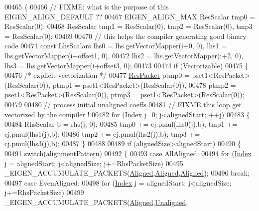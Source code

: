 \begin{DoxyCode}
{{00465   \{
00466     \textcolor{comment}{// FIXME: what is the purpose of this EIGEN\_ALIGN\_DEFAULT ??}
00467     EIGEN\_ALIGN\_MAX ResScalar tmp0 = ResScalar(0);
00468     ResScalar tmp1 = ResScalar(0), tmp2 = ResScalar(0), tmp3 = ResScalar(0);
00469 
00470     \textcolor{comment}{// this helps the compiler generating good binary code}
00471     \textcolor{keyword}{const} LhsScalars lhs0 = lhs.getVectorMapper(i+0, 0),    lhs1 = lhs.getVectorMapper(i+offset1, 0),
00472                      lhs2 = lhs.getVectorMapper(i+2, 0),    lhs3 = lhs.getVectorMapper(i+offset3, 0);
00473 
00474     \textcolor{keywordflow}{if} (Vectorizable)
00475     \{
00476       \textcolor{comment}{/* explicit vectorization */}
00477       \hyperlink{class_eigen_1_1internal_1_1_tensor_lazy_evaluator_writable}{ResPacket} ptmp0 = pset1<ResPacket>(ResScalar(0)), ptmp1 = pset1<ResPacket>(ResScalar(0)),
00478                 ptmp2 = pset1<ResPacket>(ResScalar(0)), ptmp3 = pset1<ResPacket>(ResScalar(0));
00479 
00480       \textcolor{comment}{// process initial unaligned coeffs}
00481       \textcolor{comment}{// FIXME this loop get vectorized by the compiler !}
00482       \textcolor{keywordflow}{for} (\hyperlink{namespace_eigen_a62e77e0933482dafde8fe197d9a2cfde}{Index} j=0; j<alignedStart; ++j)
00483       \{
00484         RhsScalar b = rhs(j, 0);
00485         tmp0 += cj.pmul(lhs0(j),b); tmp1 += cj.pmul(lhs1(j),b);
00486         tmp2 += cj.pmul(lhs2(j),b); tmp3 += cj.pmul(lhs3(j),b);
00487       \}
00488 
00489       \textcolor{keywordflow}{if} (alignedSize>alignedStart)
00490       \{
00491         \textcolor{keywordflow}{switch}(alignmentPattern)
00492         \{
00493           \textcolor{keywordflow}{case} AllAligned:
00494             \textcolor{keywordflow}{for} (\hyperlink{namespace_eigen_a62e77e0933482dafde8fe197d9a2cfde}{Index} j = alignedStart; j<alignedSize; j+=RhsPacketSize)
00495               \_EIGEN\_ACCUMULATE\_PACKETS(\hyperlink{group__enums_gga45fe06e29902b7a2773de05ba27b47a1ad37d4c71425bb286e9b4103830538fbf}{Aligned},\hyperlink{group__enums_gga45fe06e29902b7a2773de05ba27b47a1ad37d4c71425bb286e9b4103830538fbf}{Aligned},\hyperlink{group__enums_gga45fe06e29902b7a2773de05ba27b47a1ad37d4c71425bb286e9b4103830538fbf}{Aligned});
00496             \textcolor{keywordflow}{break};
00497           \textcolor{keywordflow}{case} EvenAligned:
00498             \textcolor{keywordflow}{for} (\hyperlink{namespace_eigen_a62e77e0933482dafde8fe197d9a2cfde}{Index} j = alignedStart; j<alignedSize; j+=RhsPacketSize)
00499               \_EIGEN\_ACCUMULATE\_PACKETS(\hyperlink{group__enums_gga45fe06e29902b7a2773de05ba27b47a1ad37d4c71425bb286e9b4103830538fbf}{Aligned},\hyperlink{group__enums_gga45fe06e29902b7a2773de05ba27b47a1ac935220b4c844108e183ebe30a4d5204}{Unaligned},
}}
\end{DoxyCode}

